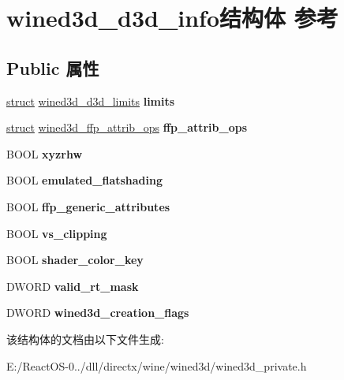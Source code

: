 \hypertarget{structwined3d__d3d__info}{}\section{wined3d\+\_\+d3d\+\_\+info结构体 参考}
\label{structwined3d__d3d__info}
\subsection*{Public 属性}
\begin{DoxyCompactItemize}
\item 
\mbox{\label{structwined3d__d3d__info_a446a4c78ffb602599dc126723d642c91}} 
\hyperlink{interfacestruct}{struct} \hyperlink{structwined3d__d3d__limits}{wined3d\+\_\+d3d\+\_\+limits} {\bfseries limits}
\item 
\mbox{\label{structwined3d__d3d__info_adc837ddf8b18d4214e4d2ded73900972}} 
\hyperlink{interfacestruct}{struct} \hyperlink{structwined3d__ffp__attrib__ops}{wined3d\+\_\+ffp\+\_\+attrib\+\_\+ops} {\bfseries ffp\+\_\+attrib\+\_\+ops}
\item 
\mbox{\label{structwined3d__d3d__info_a3d09c8d13414dd45240f13499eaebcee}} 
B\+O\+OL {\bfseries xyzrhw}
\item 
\mbox{\label{structwined3d__d3d__info_a1ca2b39493379404aa43cc6b257c8927}} 
B\+O\+OL {\bfseries emulated\+\_\+flatshading}
\item 
\mbox{\label{structwined3d__d3d__info_a43be5ff830216a80fefbeb81e23cca9f}} 
B\+O\+OL {\bfseries ffp\+\_\+generic\+\_\+attributes}
\item 
\mbox{\label{structwined3d__d3d__info_a307bc813a2fd9e10e59e0c79679b8d9a}} 
B\+O\+OL {\bfseries vs\+\_\+clipping}
\item 
\mbox{\label{structwined3d__d3d__info_a253f353ddbd887996ef894504418ba61}} 
B\+O\+OL {\bfseries shader\+\_\+color\+\_\+key}
\item 
\mbox{\label{structwined3d__d3d__info_a3192d9baa98ab03e3060bcd526e5e312}} 
D\+W\+O\+RD {\bfseries valid\+\_\+rt\+\_\+mask}
\item 
\mbox{\label{structwined3d__d3d__info_af4484eba6dd0c00b77f73b1e73f54179}} 
D\+W\+O\+RD {\bfseries wined3d\+\_\+creation\+\_\+flags}
\end{DoxyCompactItemize}


该结构体的文档由以下文件生成\+:\begin{DoxyCompactItemize}
\item 
E\+:/\+React\+O\+S-\/0../dll/directx/wine/wined3d/wined3d\+\_\+private.\+h\end{DoxyCompactItemize}
